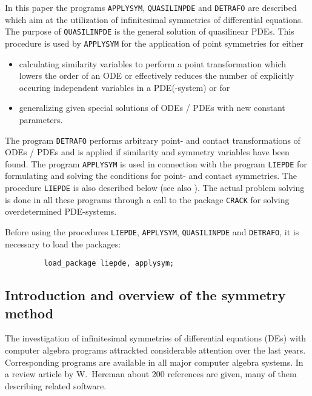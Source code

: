 

In this paper the programs \texttt{APPLYSYM}, \texttt{QUASILINPDE} and
\texttt{DETRAFO} are described which aim at the utilization
of infinitesimal symmetries of differential equations. The purpose
of \texttt{QUASILINPDE} is the general solution of
quasilinear PDEs. This procedure is used by \texttt{APPLYSYM}
for the application of point symmetries for either
\begin{itemize}
\item calculating similarity variables to perform a point transformation
which lowers the order of an ODE or effectively reduces the number of
explicitly occuring independent variables in a PDE(-system) or for
\item generalizing given special solutions of ODEs / PDEs with new constant
parameters.
\end{itemize}

The program \texttt{DETRAFO} performs arbitrary point- and contact
transformations of ODEs / PDEs and is applied if similarity
and symmetry variables have been found.
The program \texttt{APPLYSYM} is used in connection with the program
\texttt{LIEPDE} for formulating and solving the conditions for point- and
contact symmetries.  The procedure \texttt{LIEPDE} is also described  below (see also \cite{Wolf:93}).
The actual problem solving is done in all these programs through a call
to the package \texttt{CRACK} for solving overdetermined PDE-systems.

Before using  the procedures \texttt{LIEPDE}, \texttt{APPLYSYM}, \texttt{QUASILINPDE} and
\texttt{DETRAFO}, it is necessary to load the packages:
\small \begin{verbatim}
         load_package liepde, applysym;
\end{verbatim}

\subsection{Introduction and overview of the symmetry method}
The investigation of infinitesimal symmetries of differential equations
(DEs) with computer algebra programs attrackted considerable attention
over the last years. Corresponding programs are available in all
major computer algebra systems. In a review article by W.\ Hereman
\cite{Hereman:95} about 200 references are given, many of them describing related
software.

